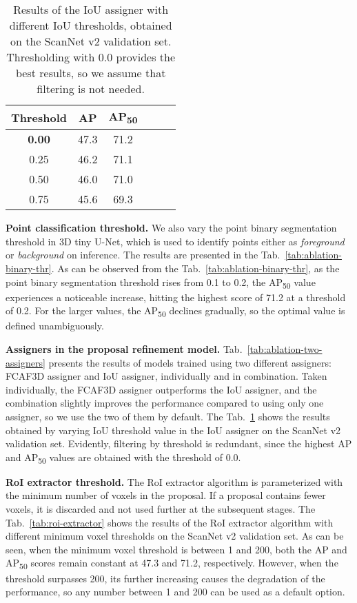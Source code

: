 \documentclass[10pt,twocolumn,letterpaper]{article}
\newcommand\inline{\noindent\textbf}
\begin{document}
\begin{table}[!h]
    \centering
\begin{tabular}{cccccc}
    \toprule
    Threshold & AP & AP\textsubscript{50} \\
    \midrule
    \textbf{0.00} & 47.3 & 71.2 \\
0.25 & 46.2 & 71.1 \\
0.50 & 46.0 & 71.0 \\
0.75 & 45.6 & 69.3  \\
\bottomrule
    \end{tabular}
    \caption{Results of the IoU assigner with different IoU thresholds, obtained on the ScanNet v2 validation set. Thresholding with 0.0 provides the best results, so we assume that filtering is not needed.}
    \label{tab:ablation-iou-assigner-thr}
\end{table}



\inline{Point classification threshold.} We also vary the point binary segmentation threshold in 3D tiny U-Net, which is used to identify points either as \textit{foreground} or \textit{background} on inference. The results are presented in the Tab.~\ref{tab:ablation-binary-thr}. As can be observed from the Tab.~\ref{tab:ablation-binary-thr}, as the point binary segmentation threshold rises from 0.1 to 0.2, the AP\textsubscript{50} value experiences a noticeable increase, hitting the highest score of 71.2 at a threshold of 0.2. For the larger values, the AP\textsubscript{50} declines gradually, so the optimal value is defined unambiguously.


\inline{Assigners in the proposal refinement model.} Tab.~\ref{tab:ablation-two-assigners} presents the results of models trained using two different assigners: FCAF3D assigner and IoU assigner, individually and in combination. Taken individually, the FCAF3D assigner outperforms the IoU assigner, and the combination slightly improves the performance compared to using only one assigner, so we use the two of them by default. The Tab.~\ref{tab:ablation-iou-assigner-thr} shows the results obtained by varying IoU threshold value in the IoU assigner on the ScanNet v2 validation set. Evidently, filtering by threshold is redundant, since the highest AP and AP\textsubscript{50} values are obtained with the threshold of 0.0.


\inline{RoI extractor threshold.} The RoI extractor algorithm is parameterized with the minimum number of voxels in the proposal. If a proposal contains fewer voxels, it is discarded and not used further at the subsequent stages. The Tab.~\ref{tab:roi-extractor} shows the results of the RoI extractor algorithm with different minimum voxel thresholds on the ScanNet v2 validation set. As can be seen, when the minimum voxel threshold is between 1 and 200, both the AP and AP\textsubscript{50} scores remain constant at 47.3 and 71.2, respectively. However, when the threshold surpasses 200, its further increasing causes the degradation of the performance, so any number between 1 and 200 can be used as a default option.
\end{document}
